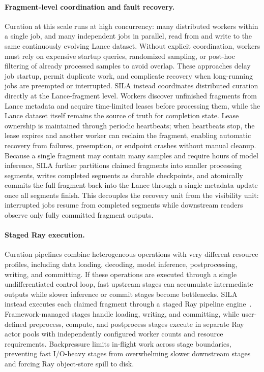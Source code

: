 \paragraph{Fragment-level coordination and fault recovery.}
Curation at this scale runs at high concurrency: many distributed workers within a single job, and many independent jobs in parallel, read from and write to the same continuously evolving Lance dataset. Without explicit coordination, workers must rely on expensive startup queries, randomized sampling, or post-hoc filtering of already processed samples to avoid overlap. These approaches delay job startup, permit duplicate work, and complicate recovery when long-running jobs are preempted or interrupted. SILA instead coordinates distributed curation directly at the Lance-fragment level. Workers discover unfinished fragments from Lance metadata and acquire time-limited leases before processing them, while the Lance dataset itself remains the source of truth for completion state. Lease ownership is maintained through periodic heartbeats; when heartbeats stop, the lease expires and another worker can reclaim the fragment, enabling automatic recovery from failures, preemption, or endpoint crashes without manual cleanup. Because a single fragment may contain many samples and require hours of model inference, SILA further partitions claimed fragments into smaller processing segments, writes completed segments as durable checkpoints, and atomically commits the full fragment back into the Lance through a single metadata update once all segments finish. This decouples the recovery unit from the visibility unit: interrupted jobs resume from completed segments while downstream readers observe only fully committed fragment outputs.

\paragraph{Staged Ray execution.}
Curation pipelines combine heterogeneous operations with very different resource profiles, including data loading, decoding, model inference, postprocessing, writing, and committing. If these operations are executed through a single undifferentiated control loop, fast upstream stages can accumulate intermediate outputs while slower inference or commit stages become bottlenecks. SILA instead executes each claimed fragment through a staged Ray pipeline engine~\citep{moritz2018raydistributedframeworkemerging}. Framework-managed stages handle loading, writing, and committing, while user-defined preprocess, compute, and postprocess stages execute in separate Ray actor pools with independently configured worker counts and resource requirements. Backpressure limits in-flight work across stage boundaries, preventing fast I/O-heavy stages from overwhelming slower downstream stages and forcing Ray object-store spill to disk.

